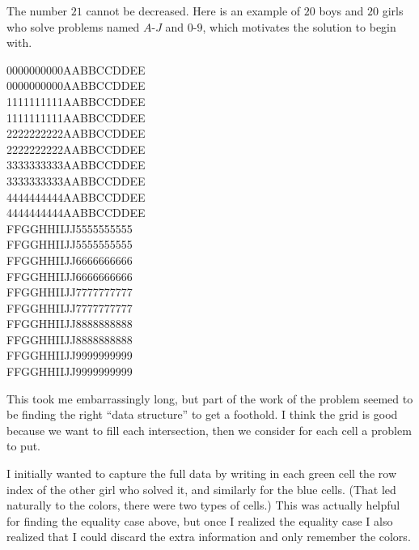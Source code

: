 \documentclass[11pt]{scrartcl}
\begin{document}
\begin{remark*}
The number $21$ cannot be decreased.
Here is an example of $20$ boys and $20$ girls
who solve problems named $A$-$J$
and $0$-$9$, which motivates the solution to begin with.
\begin{center}
\scriptsize \ttfamily
{\color{green}0000000000}{\color{blue}AABBCCDDEE} \\
{\color{green}0000000000}{\color{blue}AABBCCDDEE} \\
{\color{green}1111111111}{\color{blue}AABBCCDDEE} \\
{\color{green}1111111111}{\color{blue}AABBCCDDEE} \\
{\color{green}2222222222}{\color{blue}AABBCCDDEE} \\
{\color{green}2222222222}{\color{blue}AABBCCDDEE} \\
{\color{green}3333333333}{\color{blue}AABBCCDDEE} \\
{\color{green}3333333333}{\color{blue}AABBCCDDEE} \\
{\color{green}4444444444}{\color{blue}AABBCCDDEE} \\
{\color{green}4444444444}{\color{blue}AABBCCDDEE} \\
{\color{blue}FFGGHHIIJJ}{\color{green}5555555555} \\
{\color{blue}FFGGHHIIJJ}{\color{green}5555555555} \\
{\color{blue}FFGGHHIIJJ}{\color{green}6666666666} \\
{\color{blue}FFGGHHIIJJ}{\color{green}6666666666} \\
{\color{blue}FFGGHHIIJJ}{\color{green}7777777777} \\
{\color{blue}FFGGHHIIJJ}{\color{green}7777777777} \\
{\color{blue}FFGGHHIIJJ}{\color{green}8888888888} \\
{\color{blue}FFGGHHIIJJ}{\color{green}8888888888} \\
{\color{blue}FFGGHHIIJJ}{\color{green}9999999999} \\
{\color{blue}FFGGHHIIJJ}{\color{green}9999999999}
\end{center}
\end{remark*}

\begin{remark*}
  This took me embarrassingly long,
  but part of the work of the problem seemed to be
  finding the right ``data structure'' to get a foothold.
  I think the grid is good because we want to fill each intersection,
  then we consider for each cell a problem to put.

  I initially wanted to capture the full data by writing
  in each green cell the row index of the other girl who solved it,
  and similarly for the blue cells.
  (That led naturally to the colors, there were two types of cells.)
  This was actually helpful for finding the equality case above,
  but once I realized the equality case
  I also realized that I could discard the extra information
  and only remember the colors.
\end{remark*}
\pagebreak
\end{document}

